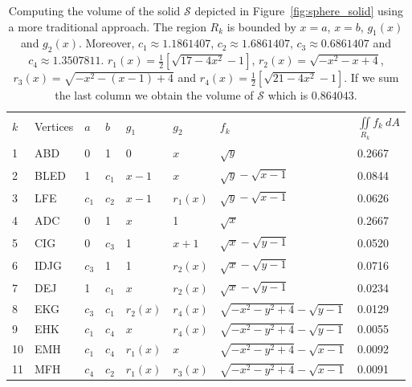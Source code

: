 \documentclass{article}
\theoremstyle{theorem}
\theoremstyle{definition}
\begin{document}
\begin{table}

\caption{Computing the volume of the solid $\mathcal{S}$ depicted in Figure~\ref{fig:sphere_solid} using a more traditional approach. The region $R_k$ is bounded by $x=a$, $x=b$, $g_1(x)$ and $g_2(x)$. Moreover, $c_1 \approx 1.1861407$, $c_2 \approx 1.6861407$, $c_3 \approx 0.6861407$ and $c_4 \approx 1.3507811$. $r_1(x) = \frac{1}{2}[\sqrt{17-4x^2}-1]$,
$r_2(x) = \sqrt{-x^2-x+4}$, $r_3(x) = \sqrt{-x^2-(x-1)+4}$ and $r_4(x) = \frac{1}{2}[\sqrt{21-4x^2}-1]$. If we sum the last column we obtain the volume of $\mathcal{S}$ which is $0.864043$.} 
\label{tab:table1}
\begin{center}

\begin{tabular}{|l l l l l l l l|}
  $k$ & Vertices & $a$ & $b$  & $g_1$ & $g_2$ & $f_k$ & $\iint\limits_{\!R_k} f_k~dA$\\
  1 & ABD & 0 & 1& 0 & $x$ & $\sqrt{y}$ & 0.2667\\
  2 & BLED& 1& $c_1$ & $x-1$ & $x$ & $\sqrt{y} - \sqrt{x-1}$& 0.0844\\
  3 & LFE& $c_1$ & $c_2$ & $x-1$ & $r_1(x)$&$\sqrt{y} - \sqrt{x-1}$&0.0626\\
  4 & ADC& 0 & 1 & $x$ & 1 & $\sqrt{x}$ &0.2667\\
  5 & CIG& 0 & $c_3$ & 1 & $x+1$ & $\sqrt{x} - \sqrt{y-1}$ &0.0520\\
  6 & IDJG& $c_3$ & 1 & 1 & $r_2(x)$ & $\sqrt{x} - \sqrt{y-1}$&0.0716\\
  7 & DEJ& 1& $c_1$& $x$ & $r_2(x)$ & $\sqrt{x} - \sqrt{y-1}$&0.0234\\ 
  8 & EKG& $c_3$& $c_1$& $r_2(x)$ & $r_4(x)$ & $\sqrt{-x^2-y^2+4}-\sqrt{y-1}$&0.0129\\ 
  9 & EHK& $c_1$& $c_4$& $x$& $r_4(x)$ & $\sqrt{-x^2-y^2+4}-\sqrt{y-1}$&0.0055\\
  10& EMH& $c_1$& $c_4$& $r_1(x)$& $x$ & $\sqrt{-x^2-y^2+4}-\sqrt{x-1}$&0.0092\\
  11& MFH& $c_4$& $c_2$& $r_1(x)$& $r_3(x)$ & $\sqrt{-x^2-y^2+4}-\sqrt{x-1}$&0.0091\\ 

\end{tabular}
\end{center}
\end{table}
\end{document}
